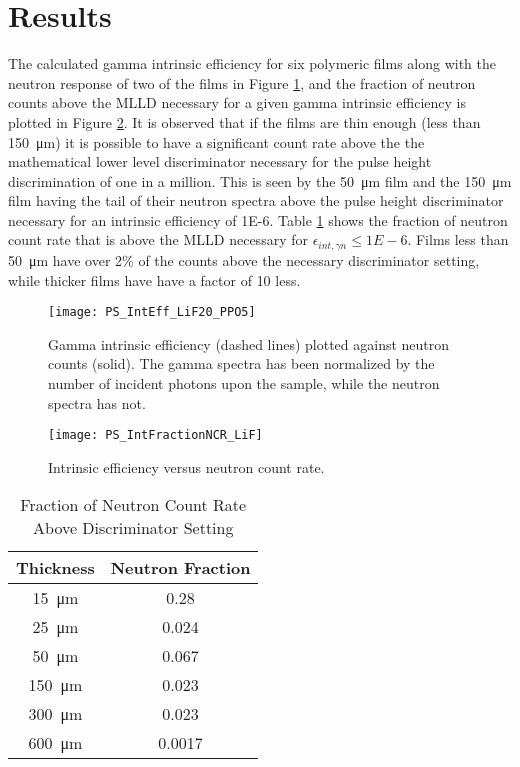 \documentclass[draftcls,onecolumn]{IEEEtran}
\begin{document}
\section{Results}
\label{sec:Results}
The calculated gamma intrinsic efficiency for six polymeric films along with the neutron response of two of the films in Figure \ref{fig:GammaIntrNeutronCounts}, and the fraction of neutron counts above the MLLD necessary for a given gamma intrinsic efficiency is plotted in Figure \ref{fig:crVsIntEff}.
It is observed that if the films are thin enough (less than \SI{150}{\um}) it is possible to have a significant count rate above the the mathematical lower level discriminator necessary for the pulse height discrimination of one in a million.
This is seen by the \SI{50}{\um} film and the \SI{150}{\um} film having the tail of their neutron spectra above the pulse height discriminator necessary for an intrinsic efficiency of \num{1E-6}.
Table \ref{tab:FractionCRGamma} shows the fraction of neutron count rate that is above the MLLD necessary for $\epsilon_{int,\gamma n} \le \si{1E-6}$.
Films less than \SI{50}{\um} have over 2\% of the counts above the necessary discriminator setting, while thicker films have have a factor of 10 less.
\begin{figure}[ht]
    \centering
    \texttt{[image: PS\_IntEff\_LiF20\_PPO5]}
    \caption{Gamma intrinsic efficiency (dashed lines) plotted against neutron counts (solid). The gamma spectra has been normalized by the number of incident photons upon the sample, while the neutron spectra has not.}
    \label{fig:GammaIntrNeutronCounts}
\end{figure}
\begin{figure}[ht]
    \centering
    \texttt{[image: PS\_IntFractionNCR\_LiF]}
    \caption{Intrinsic efficiency versus neutron count rate. }
    \label{fig:crVsIntEff}
\end{figure}
\begin{table}[]
    \caption{Fraction of Neutron Count Rate Above Discriminator Setting}
	\centering
	\begin{tabular}{c | c}
	Thickness & Neutron Fraction \\
	\hline
	\hline
	\SI{15}{\um} & 0.28 \\
	\SI{25}{\um} & 0.024 \\
	\SI{50}{\um}  & 0.067 \\
	\SI{150}{\um}  & 0.023 \\
	\SI{300}{\um}  & 0.023 \\
	\SI{600}{\um}  & 0.0017 \\
	\end{tabular}
  \label{tab:FractionCRGamma}
\end{table}
\end{document}

